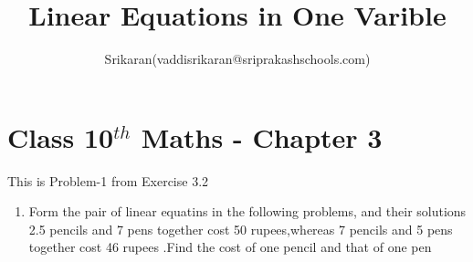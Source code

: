\documentclass[12pt]{article}
\title{Linear Equations in One Varible}
\author{Srikaran(vaddisrikaran@sriprakashschools.com)}
\begin{document}
\maketitle
\section*{Class 10$^{th}$ Maths - Chapter 3}
This is Problem-1 from Exercise 3.2
\begin{enumerate}
\item Form the pair of linear equatins in the following problems, and their solutions\\
2.5 pencils and 7 pens together cost 50 rupees,whereas 7 pencils and 5 pens together cost 46 rupees .Find the cost of one pencil and that of one pen
\end{enumerate}
\end{document}
